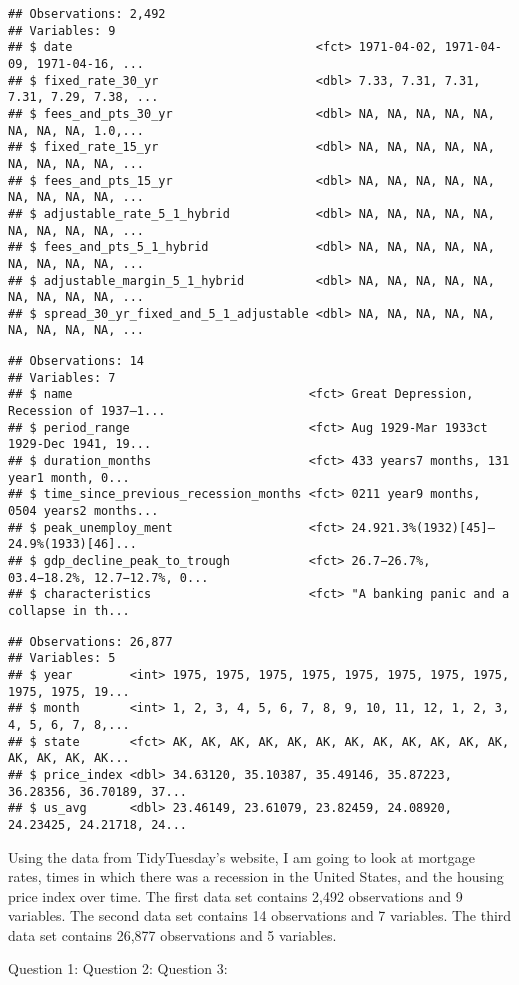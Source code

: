 \documentclass[
]{article}
\begin{document}
\begin{verbatim}
## Observations: 2,492
## Variables: 9
## $ date                                  <fct> 1971-04-02, 1971-04-09, 1971-04-16, ...
## $ fixed_rate_30_yr                      <dbl> 7.33, 7.31, 7.31, 7.31, 7.29, 7.38, ...
## $ fees_and_pts_30_yr                    <dbl> NA, NA, NA, NA, NA, NA, NA, NA, 1.0,...
## $ fixed_rate_15_yr                      <dbl> NA, NA, NA, NA, NA, NA, NA, NA, NA, ...
## $ fees_and_pts_15_yr                    <dbl> NA, NA, NA, NA, NA, NA, NA, NA, NA, ...
## $ adjustable_rate_5_1_hybrid            <dbl> NA, NA, NA, NA, NA, NA, NA, NA, NA, ...
## $ fees_and_pts_5_1_hybrid               <dbl> NA, NA, NA, NA, NA, NA, NA, NA, NA, ...
## $ adjustable_margin_5_1_hybrid          <dbl> NA, NA, NA, NA, NA, NA, NA, NA, NA, ...
## $ spread_30_yr_fixed_and_5_1_adjustable <dbl> NA, NA, NA, NA, NA, NA, NA, NA, NA, ...
\end{verbatim}

\begin{verbatim}
## Observations: 14
## Variables: 7
## $ name                                 <fct> Great Depression, Recession of 1937–1...
## $ period_range                         <fct> Aug 1929-Mar 1933ct 1929-Dec 1941, 19...
## $ duration_months                      <fct> 433 years7 months, 131 year1 month, 0...
## $ time_since_previous_recession_months <fct> 0211 year9 months, 0504 years2 months...
## $ peak_unemploy_ment                   <fct> 24.921.3%(1932)[45]–  24.9%(1933)[46]...
## $ gdp_decline_peak_to_trough           <fct> 26.7−26.7%, 03.4−18.2%, 12.7−12.7%, 0...
## $ characteristics                      <fct> "A banking panic and a collapse in th...
\end{verbatim}

\begin{verbatim}
## Observations: 26,877
## Variables: 5
## $ year        <int> 1975, 1975, 1975, 1975, 1975, 1975, 1975, 1975, 1975, 1975, 19...
## $ month       <int> 1, 2, 3, 4, 5, 6, 7, 8, 9, 10, 11, 12, 1, 2, 3, 4, 5, 6, 7, 8,...
## $ state       <fct> AK, AK, AK, AK, AK, AK, AK, AK, AK, AK, AK, AK, AK, AK, AK, AK...
## $ price_index <dbl> 34.63120, 35.10387, 35.49146, 35.87223, 36.28356, 36.70189, 37...
## $ us_avg      <dbl> 23.46149, 23.61079, 23.82459, 24.08920, 24.23425, 24.21718, 24...
\end{verbatim}

Using the data from TidyTuesday's website, I am going to look at
mortgage rates, times in which there was a recession in the United
States, and the housing price index over time. The first data set
contains 2,492 observations and 9 variables. The second data set
contains 14 observations and 7 variables. The third data set contains
26,877 observations and 5 variables.

Question 1: Question 2: Question 3:
\end{document}
